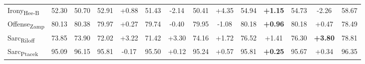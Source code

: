 \begin{table*}[ht]
\begin{tabular}{@{}lcc:cc:cc:cc:cc:cc|c@{}}
Irony\textsubscript{Hee-B}    & 52.30                    &           50.70       & \colorbox{green!10}{52.91}                                   & \colorbox{green!10}{+0.88}                                & 51.43                                   & -2.14                                & 50.41                                   & \colorbox{green!10}{+4.35}                                & \colorbox{green!10}{54.94}                                   & \colorbox{green!10}{\textbf{+1.15}}                                & \colorbox{green!10}{54.73}                                   & \colorbox{green!10}{-2.26}                     & 58.67           \\
Offense\textsubscript{Zamp} & 80.13          &    \colorbox{green!10}{80.38}                  & 79.97                                   & \colorbox{green!10}{+0.27}                                & 79.74                                   & -0.40                                & 79.95                                   & -1.08                                & \colorbox{green!10}{80.18}                                   & \colorbox{green!10}{\textbf{+0.96}}                                & \colorbox{green!10}{80.18}                                   & \colorbox{green!10}{+0.47}                    &    78.49            \\
Sarc\textsubscript{Riloff}   & 73.85                &            \colorbox{green!10}{73.90}    & 72.02                                   & \colorbox{green!10}{+3.22}                                & 71.42                                   & \colorbox{green!10}{+3.30}                               & \colorbox{green!10}{74.16}                                  & \colorbox{green!10}{+1.72}                               & \colorbox{green!10}{76.52}                                  & \colorbox{green!10}{+1.41}                               & \colorbox{green!10}{76.30}                                  & \colorbox{green!10}{\textbf{+3.80}}            &    78.81                   \\

Sarc\textsubscript{Ptacek}   & 95.09        &         \colorbox{green!10}{96.15}                    & \colorbox{green!10}{95.81}                                  & \colorbox{green!10}{-0.17}                               & \colorbox{green!10}{95.50}                                  & \colorbox{green!10}{+0.12}                               & \colorbox{green!10}{95.24}                                  & \colorbox{green!10}{+0.57}                               & \colorbox{green!10}{95.81}                                  & \colorbox{green!10}{\textbf{+0.25}}                               & \colorbox{green!10}{95.67}                                  & \colorbox{green!10}{+0.34}               &    96.35                \\


\end{tabular}
\end{table*}
